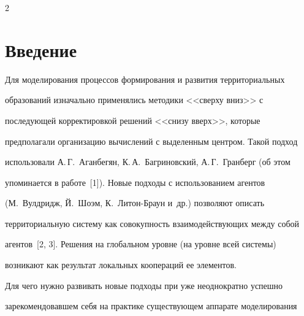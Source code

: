 









      \thispagestyle{headings}





      \begin{multicols}{2}


      


            \label{st\stat}





\section{Введение}





  Для моделирования процессов формирования и развития территориальных 


образований изначально применялись методики <<сверху вниз>> с 


последующей корректировкой решений <<снизу вверх>>, которые 


предполагали организацию вычислений с выделенным центром. Такой подход 


использовали А.\,Г.~Аганбегян, К.\,А.~Багриновский, А.\,Г.~Гранберг (об этом 


упоминается в работе~[1]). Новые подходы с использованием агентов 


(М.~Вулдридж, Й.~Шоэм, К.~Ли\-тон-Бра\-ун и~др.) позволяют описать 


территориальную систему  как совокупность взаимодействующих между собой 


агентов~[2, 3]. Решения на глобальном уровне (на уровне всей системы) 


возникают как результат локальных коопераций ее элементов. 


  


  Для чего нужно развивать новые подходы при уже неоднократно успешно 


зарекомендовавшем себя на практике существующем аппарате моделирования 



\end{multicols}
